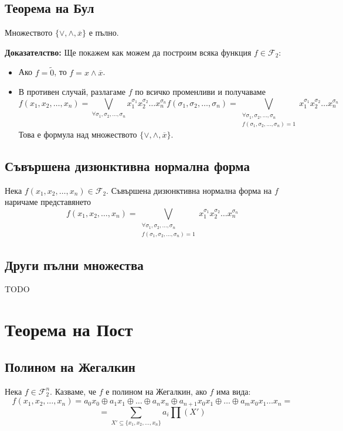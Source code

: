 \documentclass[fleqn,12pt]{article}
\begin{document}
\begin{flushleft}
\subsection{Теорема на Бул}
Множеството $\{ \vee, \wedge, \overline{x} \}$ е пълно.

\textbf{Доказателство: } Ще покажем как можем да построим всяка функция $f \in \mathcal{F}_2$:
\begin{itemize}
    \item Ако $f = \widetilde{0}$, то $f = x \wedge \overline{x}$.
    \item В противен случай, разлагаме $f$ по всичко променливи и получаваме
    \[ f(x_1, x_2, \dots, x_n) = \bigvee_{\forall \sigma_1, \sigma_2, \dots, \sigma_n} x_1^{\sigma_1} x_2^{\sigma_2} \dots x_n^{\sigma_n} f(\sigma_1, \sigma_2, \dots, \sigma_n) =
    \bigvee_{\substack{\forall \sigma_1, \sigma_2, \dots, \sigma_n \\ f(\sigma_1, \sigma_2, \dots, \sigma_n) = 1}} x_1^{\sigma_1} x_2^{\sigma_2} \dots x_n^{\sigma_n}\]
    Това е формула над множеството $\{ \vee, \wedge, \overline{x} \}$.
\end{itemize}

\subsection{Съвършена дизюнктивна нормална форма}
Нека $f(x_1, x_2, \dots, x_n) \in \mathcal{F}_2$. Съвършена дизюнктивна нормална форма на $f$ наричаме представянето
\[ f(x_1, x_2, \dots, x_n) = 
    \bigvee_{\substack{\forall \sigma_1, \sigma_2, \dots, \sigma_n \\ f(\sigma_1, \sigma_2, \dots, \sigma_n) = 1}} x_1^{\sigma_1} x_2^{\sigma_2} \dots x_n^{\sigma_n}\]

\subsection{Други пълни множества}
TODO

\section{Теорема на Пост}
\subsection{Полином на Жегалкин}
Нека $f \in \mathcal{F}_2^n$. Казваме, че $f$ е полином на Жегалкин, ако $f$ има вида:
\[ f(x_1, x_2, \dots, x_n) = a_0 x_0 \oplus a_1 x_1 \oplus \dots \oplus a_n x_n \oplus a_{n+1} x_0 x_1 \oplus \dots \oplus a_m x_0 x_1 \dots x_n = \]
\[ = \sum_{X' \subseteq \{x_1, x_2, \dots, x_n\}} a_i \prod(X') \]


\end{flushleft}
\end{document}
